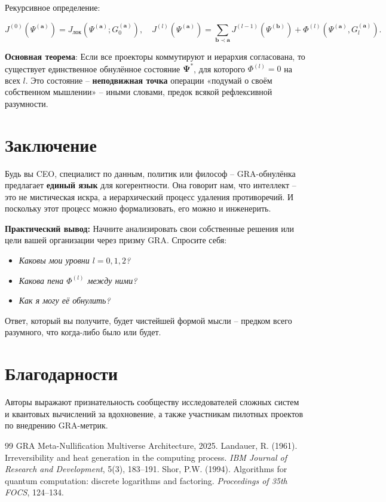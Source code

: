 \documentclass[12pt]{article}
\begin{document}
Рекурсивное определение:

\[
J^{(0)}(\Psi^{(\mathbf{a})}) = J_{\text{лок}}(\Psi^{(\mathbf{a})}; G_0^{(\mathbf{a})}), \quad
J^{(l)}(\Psi^{(\mathbf{a})}) = \sum_{\mathbf{b}\prec\mathbf{a}} J^{(l-1)}(\Psi^{(\mathbf{b})}) + \Phi^{(l)}(\Psi^{(\mathbf{a})}, G_l^{(\mathbf{a})}) .
\]

\textbf{Основная теорема}: Если все проекторы коммутируют и иерархия согласована, то существует единственное обнулённое состояние \( \mathbf{\Psi}^* \), для которого \( \Phi^{(l)} = 0 \) на всех \( l \). Это состояние – \textbf{неподвижная точка} операции «подумай о своём собственном мышлении» – иными словами, предок всякой рефлексивной разумности.

\section{Заключение}
Будь вы CEO, специалист по данным, политик или философ – GRA-обнулёнка предлагает \textbf{единый язык} для когерентности. Она говорит нам, что интеллект – это не мистическая искра, а иерархический процесс удаления противоречий. И поскольку этот процесс можно формализовать, его можно и инженерить.

\textbf{Практический вывод:} Начните анализировать свои собственные решения или цели вашей организации через призму GRA. Спросите себя:
\begin{itemize}
    \item \textit{Каковы мои уровни \( l=0,1,2 \)?}
    \item \textit{Какова пена \( \Phi^{(l)} \) между ними?}
    \item \textit{Как я могу её обнулить?}
\end{itemize}
Ответ, который вы получите, будет чистейшей формой мысли – предком всего разумного, что когда-либо было или будет.

\section*{Благодарности}
Авторы выражают признательность сообществу исследователей сложных систем и квантовых вычислений за вдохновение, а также участникам пилотных проектов по внедрению GRA-метрик.

\begin{thebibliography}{99}
 GRA Meta-Nullification Multiverse Architecture, 2025.
 Landauer, R. (1961). Irreversibility and heat generation in the computing process. \textit{IBM Journal of Research and Development}, 5(3), 183–191.
 Shor, P.W. (1994). Algorithms for quantum computation: discrete logarithms and factoring. \textit{Proceedings of 35th FOCS}, 124–134.
\end{thebibliography}
\end{document}
